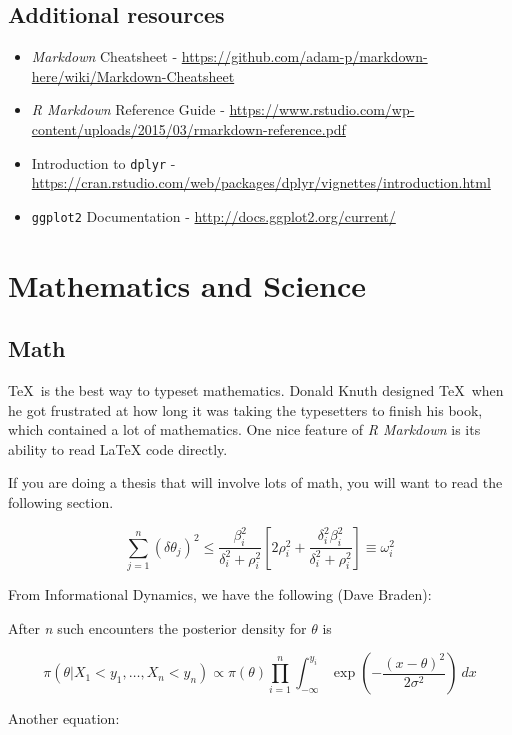 \documentclass[12pt, twoside]{amherstthesis}
\theoremstyle{definition}
\theoremstyle{definition}
\theoremstyle{definition}
\theoremstyle{remark}
\begin{document}
\hypertarget{additional-resources}{%
\section{Additional resources}\label{additional-resources}}
\begin{itemize}
\item
  \emph{Markdown} Cheatsheet - \url{https://github.com/adam-p/markdown-here/wiki/Markdown-Cheatsheet}
\item
  \emph{R Markdown} Reference Guide - \url{https://www.rstudio.com/wp-content/uploads/2015/03/rmarkdown-reference.pdf}
\item
  Introduction to \texttt{dplyr} - \url{https://cran.rstudio.com/web/packages/dplyr/vignettes/introduction.html}
\item
  \texttt{ggplot2} Documentation - \url{http://docs.ggplot2.org/current/}
\end{itemize}
\hypertarget{math-sci}{%
\chapter{Mathematics and Science}\label{math-sci}}

\hypertarget{math}{%
\section{Math}\label{math}}

\TeX~is the best way to typeset mathematics. Donald Knuth designed \TeX~when he got frustrated at how long it was taking the typesetters to finish his book, which contained a lot of mathematics. One nice feature of \emph{R Markdown} is its ability to read LaTeX code directly.

If you are doing a thesis that will involve lots of math, you will want to read the following section.

\[
\sum_{j=1}^n (\delta\theta_j)^2 \leq 
\frac{\beta_i^2}{\delta_i^2 + \rho_i^2}
\left[ 2\rho_i^2 + \frac{\delta_i^2\beta_i^2}{\delta_i^2 + \rho_i^2} \right] \equiv \omega_i^2
\]

From Informational Dynamics, we have the following (Dave Braden):

After \emph{n} such encounters the posterior density for \(\theta\) is

\[
\pi(\theta|X_1< y_1,\dots,X_n<y_n) \varpropto \pi(\theta) \prod_{i=1}^n\int_{-\infty}^{y_i}
   \exp\left(-\frac{(x-\theta)^2}{2\sigma^2}\right)\ dx
\]

Another equation:
\end{document}
